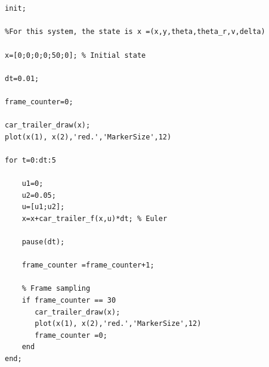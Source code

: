 \documentclass{article}
\begin{document}
\begin{tcolorbox}
[
title={File \texttt{car\_trailer\_main.m}}
]
\begin{scriptsize}
\begin{verbatim}


init;

%For this system, the state is x =(x,y,theta,theta_r,v,delta)

x=[0;0;0;0;50;0]; % Initial state

dt=0.01;

frame_counter=0;

car_trailer_draw(x); 
plot(x(1), x(2),'red.','MarkerSize',12)

for t=0:dt:5
    
    u1=0;
    u2=0.05;
    u=[u1;u2];
    x=x+car_trailer_f(x,u)*dt; % Euler
    
    pause(dt);
    
    frame_counter =frame_counter+1;
    
    % Frame sampling
    if frame_counter == 30
       car_trailer_draw(x); 
       plot(x(1), x(2),'red.','MarkerSize',12)
       frame_counter =0;
    end
end;




\end{verbatim}
\end{scriptsize}
\end{tcolorbox}
\end{document}
